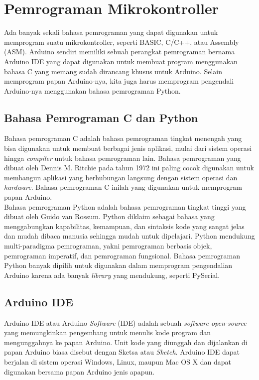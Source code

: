 \section{Pemrograman Mikrokontroller}
\tab Ada banyak sekali bahasa pemrograman yang dapat digunakan untuk memprogram suatu mikrokontroller, seperti BASIC, C/C++, atau Assembly (ASM). Arduino sendiri memiliki sebuah perangkat pemrograman bernama Arduino IDE yang dapat digunakan untuk membuat program menggunakan bahasa C yang memang sudah dirancang khusus untuk Arduino. Selain memprogram papan Arduino-nya, kita juga harus memprogram pengendali Arduino-nya menggunakan bahasa pemrograman Python. 

\subsection{Bahasa Pemrograman C dan Python}
\tab Bahasa pemrograman C adalah bahasa pemrograman tingkat menengah yang bisa digunakan untuk membuat berbagai jenis aplikasi, mulai dari sistem operasi hingga \textit{compiler} untuk bahasa pemrograman lain. Bahasa pemrograman yang dibuat oleh Dennis M. Ritchie pada tahun 1972 ini paling cocok digunakan untuk membangun aplikasi yang berhubungan langsung dengan sistem operasi dan \textit{hardware}. Bahasa pemrograman C inilah yang digunakan untuk memprogram papan Arduino.\\
\tab Bahasa pemrograman Python adalah bahasa pemrograman tingkat tinggi yang dibuat oleh Guido van Rossum. Python diklaim sebagai bahasa yang menggabungkan kapabilitas, kemampuan, dan sintaksis kode yang sangat jelas dan mudah dibaca manusia sehingga mudah untuk dipelajari. Python mendukung multi-paradigma pemrograman, yakni pemrograman berbasis objek, pemrograman imperatif, dan pemrograman fungsional. Bahasa pemrograman Python banyak dipilih untuk digunakan dalam memprogram pengendalian Arduino karena ada banyak \textit{library} yang mendukung, seperti PySerial.

\subsection{Arduino IDE}
\tab Arduino IDE atau Arduino \textit{Software} (IDE) adalah sebuah \textit{software open-source} yang memungkinkan pengembang untuk menulis kode program dan mengunggahnya ke papan Arduino. Unit kode yang diunggah dan dijalankan di papan Arduino biasa disebut dengan Sketsa atau \textit{Sketch}. Arduino IDE dapat berjalan di sistem operasi Windows, Linux, maupun Mac OS X dan dapat digunakan bersama papan Arduino jenis apapun. 

